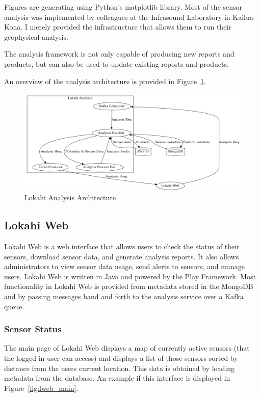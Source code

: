 Figures are generating using Python's matplotlib library. Most of the sensor analysis was implemented by colleagues at the Infrasound Laboratory in Kailua-Kona. I merely provided the infrastructure that allows them to run their geophysical analysis.

The analysis framework is not only capable of producing new reports and products, but can also be used to update existing reports and products.

An overview of the analysis architecture is provided in Figure~\ref{fig:analysis_architecture}.

\begin{figure}
	\centering
	\includegraphics[width=\linewidth]{figures/analysis_architecture.png}
	\caption{Lokahi Analysis Architecture}
	\label{fig:analysis_architecture}
\end{figure}

\subsection{Lokahi Web}\label{subsec:lokahi-web}
Lokahi Web is a web interface that allows users to check the status of their sensors, download sensor data, and generate analysis reports. It also allows administrators to view sensor data usage, send alerts to sensors, and manage users. Lokahi Web is written in Java and powered by the Play Framework. Most functionality in Lokahi Web is provided from metadata stored in the MongoDB and by passing messages band and forth to the analysis service over a Kafka queue.

\subsubsection{Sensor Status}
The main page of Lokahi Web displays a map of currently active sensors (that the logged in user can access) and displays a list of those sensors sorted by distance from the users current location. This data is obtained by loading metadata from the database. An example if this interface is displayed in Figure~\ref{fig:lweb_main}.

